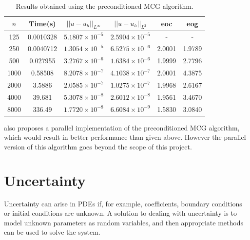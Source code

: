 \documentclass{article}
\numberwithin{equation}{section}
\begin{document}
\begin{table}[H]
\centering
\begin{tabular}{|c|c|c|c|c|c|}
\hline
$n$ & Time(s) & $|| u - u_h ||_{L^{\infty}}$ &$|| u - u_h ||_{L^{2}}$ & eoc & eog \\
\hline
125 & 0.0010328 & $5.1807 \times 10^{-5}$ & $2.5904 \times 10^{-5}$ & - & - \\
250 & 0.0040712 & $1.3054 \times 10^{-5}$ & $6.5275 \times 10^{-6}$ & 2.0001 & 1.9789 \\
500 & 0.027955 & $3.2767 \times 10^{-6}$ & $1.6384 \times 10^{-6}$ & 1.9999 & 2.7796 \\
1000 & 0.58508 & $8.2078 \times 10^{-7}$ & $4.1038 \times 10^{-7}$ & 2.0001 & 4.3875 \\
2000 & 3.5886 & $2.0585 \times 10^{-7}$ & $1.0275 \times 10^{-7}$ & 1.9968 & 2.6167 \\
4000 & 39.681 & $5.3078 \times 10^{-8}$ & $2.6012 \times 10^{-8}$ & 1.9561 & 3.4670 \\
8000 & 336.49 & $1.7720 \times 10^{-8}$ & $6.6084 \times 10^{-9}$ & 1.5830 & 3.0840 \\
\hline
\end{tabular}
\captionsetup{justification=centering}
\caption{Results obtained using the preconditioned MCG algorithm.}
\end{table}

\cite{Hou} also proposes a parallel implementation of the preconditioned MCG algorithm, which would result in better performance than given above. However the parallel version of this algorithm goes beyond the scope of this project. 


\newpage

\section{Uncertainty}
Uncertainty can arise in PDEs if, for example, coefficients, boundary conditions or initial conditions are unknown. A solution to dealing with uncertainty is to model unknown parameters as random variables, and then appropriate methods can be used to solve the system. 
\end{document}
